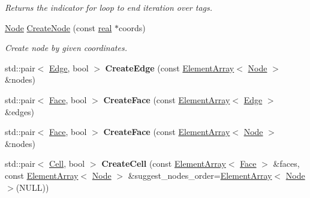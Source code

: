 \begin{DoxyCompactItemize}
\begin{DoxyCompactList}\small\item\em Returns the indicator for loop to end iteration over tags. \end{DoxyCompactList}\item 
\hyperlink{classINMOST_1_1Node}{Node} \hyperlink{classINMOST_1_1Mesh_a2edad518a07d8d9cfadf7803553a4991}{Create\-Node} (const \hyperlink{classINMOST_1_1Storage_a853346784b4a5822a7fac54d8f10f805}{real} $\ast$coords)
\begin{DoxyCompactList}\small\item\em Create node by given coordinates. \end{DoxyCompactList}\item 
\hypertarget{classINMOST_1_1Mesh_ae3b50ae7b0deede13ab3425cd6547943}{std\-::pair$<$ \hyperlink{classINMOST_1_1Edge}{Edge}, bool $>$ {\bfseries Create\-Edge} (const \hyperlink{classINMOST_1_1ElementArray}{Element\-Array}$<$ \hyperlink{classINMOST_1_1Node}{Node} $>$ \&nodes)}\label{classINMOST_1_1Mesh_ae3b50ae7b0deede13ab3425cd6547943}

\item 
\hypertarget{classINMOST_1_1Mesh_a709a5702c9f1dca9247ddf3efc23f411}{std\-::pair$<$ \hyperlink{classINMOST_1_1Face}{Face}, bool $>$ {\bfseries Create\-Face} (const \hyperlink{classINMOST_1_1ElementArray}{Element\-Array}$<$ \hyperlink{classINMOST_1_1Edge}{Edge} $>$ \&edges)}\label{classINMOST_1_1Mesh_a709a5702c9f1dca9247ddf3efc23f411}

\item 
\hypertarget{classINMOST_1_1Mesh_ae71e8a84e80ee682db190ee94302d8eb}{std\-::pair$<$ \hyperlink{classINMOST_1_1Face}{Face}, bool $>$ {\bfseries Create\-Face} (const \hyperlink{classINMOST_1_1ElementArray}{Element\-Array}$<$ \hyperlink{classINMOST_1_1Node}{Node} $>$ \&nodes)}\label{classINMOST_1_1Mesh_ae71e8a84e80ee682db190ee94302d8eb}

\item 
\hypertarget{classINMOST_1_1Mesh_a66260da2a0bf10c3d4876dea49dfbd58}{std\-::pair$<$ \hyperlink{classINMOST_1_1Cell}{Cell}, bool $>$ {\bfseries Create\-Cell} (const \hyperlink{classINMOST_1_1ElementArray}{Element\-Array}$<$ \hyperlink{classINMOST_1_1Face}{Face} $>$ \&faces, const \hyperlink{classINMOST_1_1ElementArray}{Element\-Array}$<$ \hyperlink{classINMOST_1_1Node}{Node} $>$ \&suggest\-\_\-nodes\-\_\-order=\hyperlink{classINMOST_1_1ElementArray}{Element\-Array}$<$ \hyperlink{classINMOST_1_1Node}{Node} $>$(N\-U\-L\-L))}\label{classINMOST_1_1Mesh_a66260da2a0bf10c3d4876dea49dfbd58}


\end{DoxyCompactItemize}
